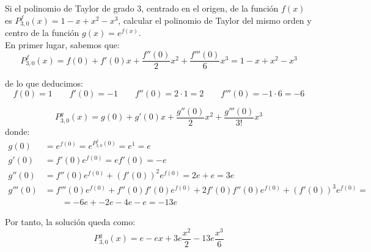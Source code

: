 \begin{ejercicio} Si el polinomio de Taylor de grado 3, centrado en el origen, de la función $f(x) $ es $ P_{3,0}^f(x) = 1-x+x^2 - x^3$, calcular el polinomio de Taylor del mismo orden y centro de la función $g(x) = e^{f(x)}$. \\

    En primer lugar, sabemos que:
    \begin{equation*}
        P_{3,0}^f(x) = f(0) + f'(0)x + \frac{f''(0)}{2} x^2 + \frac{f'''(0)}{6}x^3 = 1 - x + x^2 - x^3
    \end{equation*}

    de lo que deducimos:
    \begin{equation*}
        f(0)=1 \qquad f'(0)=-1 \qquad f''(0)=2\cdot 1 = 2 \qquad f'''(0) = -1 \cdot 6 = -6
    \end{equation*}

    \begin{equation*}
        P_{3,0}^g(x) = g(0) + g'(0)x + \frac{g''(0)}{2} x^2 + \frac{g'''(0)}{3!}x^3
    \end{equation*}
    donde:
    \begin{align*}
        g(0)& = e^{f(0)} = e^{P_{3,0}^f(0)} = e^{1} = e\\
        g'(0)& = f'(0)e^{f(0)} = ef'(0) = -e\\
        g''(0)& = f''(0)e^{f(0)} + (f'(0))^2e^{f(0)} = 2e + e = 3e \\
        g'''(0)& = f'''(0)e^{f(0)} + f''(0)f'(0)e^{f(0)} + 2f'(0)f''(0)e^{f(0)} + (f'(0))^3e^{f(0)} = \\
         & \qquad = -6e + -2e -4e -e = -13e
    \end{align*}
    
    Por tanto, la solución queda como:
    \begin{equation*}
        P_{3,0}^g(x) = e -ex + 3e\frac{x^2}{2} - 13e\frac{x^3}{6}
    \end{equation*}
\end{ejercicio}

